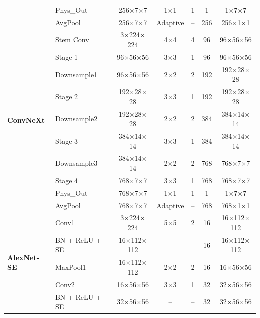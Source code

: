 \documentclass[twocolumn,iicol,pdflatex,sn-mathphys-num]{sn-jnl}%
\begin{document}
\begin{table}[htbp]
\begin{tabular}{@{}llccccc@{}}
		&Phys\_Out     & 256$\times$7$\times$7    & 1$\times$1  & 1      & 1              & 1$\times$7$\times$7 \\
		&AvgPool       & 256$\times$7$\times$7    & Adaptive    & --     & 256            & 256$\times$1$\times$1 \\
		\midrule
		\multirow{10}{*}{\textbf{ConvNeXt}} 
		&Stem Conv     & 3$\times$224$\times$224 & 4$\times$4  & 4      & 96              & 96$\times$56$\times$56 \\
		&Stage 1       & 96$\times$56$\times$56  & 3$\times$3  & 1      & 96              & 96$\times$56$\times$56 \\
		&Downsample1   & 96$\times$56$\times$56  & 2$\times$2  & 2      & 192             & 192$\times$28$\times$28 \\
		&Stage 2       & 192$\times$28$\times$28 & 3$\times$3  & 1      & 192             & 192$\times$28$\times$28 \\
		&Downsample2   & 192$\times$28$\times$28 & 2$\times$2  & 2      & 384             & 384$\times$14$\times$14 \\
		&Stage 3       & 384$\times$14$\times$14 & 3$\times$3  & 1      & 384             & 384$\times$14$\times$14 \\
		&Downsample3   & 384$\times$14$\times$14 & 2$\times$2  & 2      & 768             & 768$\times$7$\times$7 \\
		&Stage 4       & 768$\times$7$\times$7   & 3$\times$3  & 1      & 768             & 768$\times$7$\times$7 \\
		&Phys\_Out     & 768$\times$7$\times$7   & 1$\times$1  & 1      & 1               & 1$\times$7$\times$7 \\
		&AvgPool       & 768$\times$7$\times$7   & Adaptive    & --     & 768             & 768$\times$1$\times$1 \\
		\midrule
		\multirow{10}{*}{\textbf{AlexNet-SE}} 
		&Conv1        & 3$\times$224$\times$224 & 5$\times$5  & 2      & 16               & 16$\times$112$\times$112 \\
		&BN + ReLU + SE & 16$\times$112$\times$112 & --       & --     & 16               & 16$\times$112$\times$112 \\
		&MaxPool1     & 16$\times$112$\times$112 & 2$\times$2 & 2      & 16               & 16$\times$56$\times$56 \\
		&Conv2        & 16$\times$56$\times$56  & 3$\times$3  & 1      & 32               & 32$\times$56$\times$56 \\
		&BN + ReLU + SE & 32$\times$56$\times$56 & --       & --     & 32               & 32$\times$56$\times$56 \\

\end{tabular}
\end{table}
\end{document}
